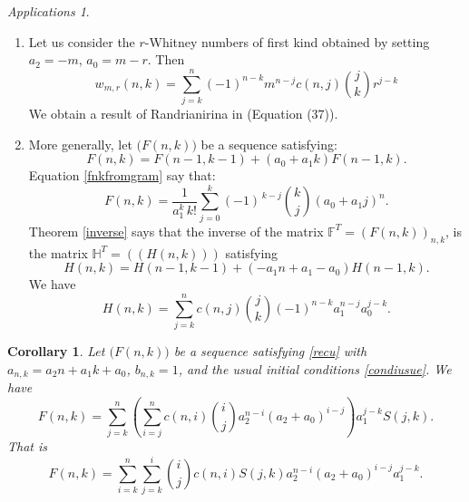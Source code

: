 \documentclass[12pt,a4paper]{article}
\newtheorem{corollary}[theorem]{Corollary}%
\theoremstyle{definition} %
\theoremstyle{remark}
\theoremstyle{examples}
\newtheorem{appli}[theorem]{Applications}
\newcommand{\suit}[1]{{#1}(n,k)}
\newcommand{\coul}[1]{#1_{n,k}}
\begin{document}
\begin{appli}\rm 
	\begin{enumerate}
		\item 
		Let us consider the $r$-Whitney numbers of first kind obtained by setting 
		$a_2=-m$, $a_0=m-r$. Then 
		\begin{equation}
		w_{m,r}(n,k)=\sum_{j=k}^n(-1)^{n-k}m^{n-j}c(n,j){j\choose k}r^{j-k}
		\end{equation} 
		We obtain a result of Randrianirina in \cite{rabeza} (Equation (37)).
		\item 	More generally, let $\big(F(n,k)\big)$ be a sequence satisfying:
		\begin{equation}
		F(n,k)=F(n-1,k-1)+ (a_0+a_1k)F(n-1,k).
		\end{equation}
		Equation \ref{fnkfromgram} say that:
		\begin{equation}\label{fnkfromgram12}
		\suit{F} = \frac{1}{a_1^k\, k!} \sum_{j=0}^{k} (-1)^{\,k-j} \binom{k}{j} (a_0 + a_1 j)^n.
		\end{equation}
		Theorem  \ref{inverse} says that the inverse of the matrix $\mathbb{F}^T=(F(n,k))_{n,k}$, is the matrix $\mathbb{H}^T=((H(n,k)))$ satisfying
		\begin{equation}
		H(n,k) = H(n-1,k-1) + (-a_1n+a_1-a_0) H(n-1,k).
		\end{equation}
		We have 
		\begin{equation} H(n,k)=\sum_{j=k}^nc(n,j){j\choose k}(-1)^{n-k}a_1^{n-j}a_0^{j-k}.
		\end{equation}
	\end{enumerate}
\end{appli}
\begin{corollary}\label{tonerw2}
	Let $\big(\suit{F}\big)$ be a sequence satisfying \eqref{recu} with $\coul{a} = a_2 n + a_1 k + a_0$, $\coul{b} = 1$, and the usual initial conditions \eqref{condiusue}. We have
	\begin{equation}
F(n,k)= \sum_{j=k}^{n}
\left(
\sum_{i=j}^{n}
c(n,i)\binom{i}{j}
a_2^{n-i}
(a_2+a_0)^{i-j}
\right)
a_1^{j-k}
S(j,k).
	\end{equation}
That is 
\begin{equation}
	F(n,k)=
	\sum_{i=k}^{n}\sum_{j=k}^{i}
	\binom{i}{j} c(n,i) S(j,k)
	a_2^{n-i}
	(a_2+a_0)^{i-j}
	a_1^{j-k}.
\end{equation}
\end{corollary}
\end{document}
